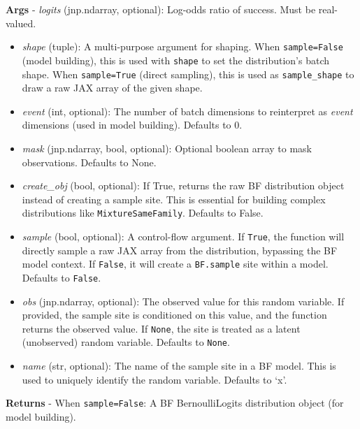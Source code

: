 \documentclass[
  letterpaper,
  DIV=11,
  numbers=noendperiod]{scrartcl}
\begin{document}
\textbf{Args} - \emph{logits} (jnp.ndarray, optional): Log-odds ratio of
success. Must be real-valued.

\begin{itemize}
\item
  \emph{shape} (tuple): A multi-purpose argument for shaping. When
  \texttt{sample=False} (model building), this is used with
  \texttt{shape} to set the distribution's batch shape. When
  \texttt{sample=True} (direct sampling), this is used as
  \texttt{sample\_shape} to draw a raw JAX array of the given shape.
\item
  \emph{event} (int, optional): The number of batch dimensions to
  reinterpret as \emph{event} dimensions (used in model building).
  Defaults to 0.
\item
  \emph{mask} (jnp.ndarray, bool, optional): Optional boolean array to
  mask observations. Defaults to None.
\item
  \emph{create\_obj} (bool, optional): If True, returns the raw BF
  distribution object instead of creating a sample site. This is
  essential for building complex distributions like
  \texttt{MixtureSameFamily}. Defaults to False.
\item
  \emph{sample} (bool, optional): A control-flow argument. If
  \texttt{True}, the function will directly sample a raw JAX array from
  the distribution, bypassing the BF model context. If \texttt{False},
  it will create a \texttt{BF.sample} site within a model. Defaults to
  \texttt{False}.
\item
  \emph{obs} (jnp.ndarray, optional): The observed value for this random
  variable. If provided, the sample site is conditioned on this value,
  and the function returns the observed value. If \texttt{None}, the
  site is treated as a latent (unobserved) random variable. Defaults to
  \texttt{None}.
\item
  \emph{name} (str, optional): The name of the sample site in a BF
  model. This is used to uniquely identify the random variable. Defaults
  to `x'.
\end{itemize}

\textbf{Returns} - When \texttt{sample=False}: A BF BernoulliLogits
distribution object (for model building).
\end{document}
